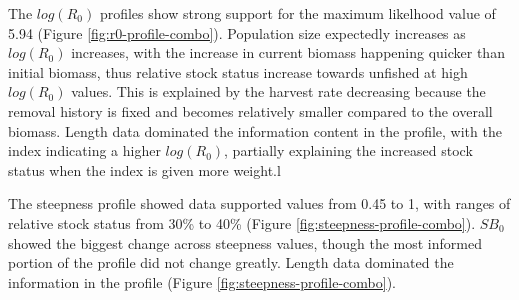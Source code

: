 \documentclass[11pt,
  english,
  a4paper,
]{article}
\begin{document}
\leavevmode\tagmcend\tagstructend\par


The {\(log(R_0)\)\leavevmode\tagmcend\tagstructend} profiles show strong support for the maximum likelhood value of 5.94 (Figure \ref{fig:r0-profile-combo}). Population size expectedly increases as {\(log(R_0)\)\leavevmode\tagmcend\tagstructend} increases, with the increase in current biomass happening quicker than initial biomass, thus relative stock status increase towards unfished at high {\(log(R_0)\)\leavevmode\tagmcend\tagstructend} values. This is explained by the harvest rate decreasing because the removal history is fixed and becomes relatively smaller compared to the overall biomass. Length data dominated the information content in the profile, with the index indicating a higher {\(log(R_0)\)\leavevmode\tagmcend\tagstructend}, partially explaining the increased stock status when the index is given more weight.l

\leavevmode\tagmcend\tagstructend\par


The steepness profile showed data supported values from 0.45 to 1, with ranges of relative stock status from 30\% to 40\% (Figure \ref{fig:steepness-profile-combo}). {\(SB_0\)\leavevmode\tagmcend\tagstructend} showed the biggest change across steepness values, though the most informed portion of the profile did not change greatly. Length data dominated the information in the profile (Figure \ref{fig:steepness-profile-combo}).

\leavevmode\tagmcend\tagstructend\par

\end{document}
